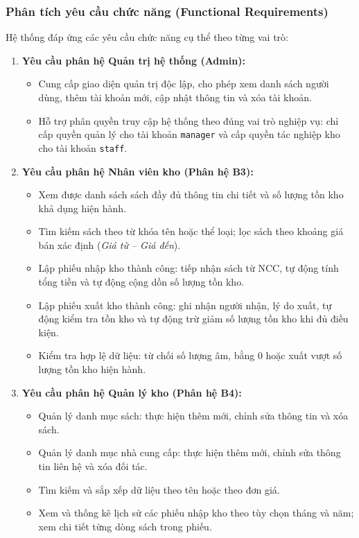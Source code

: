 \documentclass[12pt,a4paper]{article}
\begin{document}
\subsubsection{Phân tích yêu cầu chức năng (Functional Requirements)}
Hệ thống đáp ứng các yêu cầu chức năng cụ thể theo từng vai trò:
\begin{enumerate}
    \item \textbf{Yêu cầu phân hệ Quản trị hệ thống (Admin):}
    \begin{itemize}
        \item Cung cấp giao diện quản trị độc lập, cho phép xem danh sách người dùng, thêm tài khoản mới, cập nhật thông tin và xóa tài khoản.
        \item Hỗ trợ phân quyền truy cập hệ thống theo đúng vai trò nghiệp vụ: chỉ cấp quyền quản lý cho tài khoản \texttt{manager} và cấp quyền tác nghiệp kho cho tài khoản \texttt{staff}.
    \end{itemize}
    \item \textbf{Yêu cầu phân hệ Nhân viên kho (Phân hệ B3):}
    \begin{itemize}
        \item Xem được danh sách sách đầy đủ thông tin chi tiết và số lượng tồn kho khả dụng hiện hành.
        \item Tìm kiếm sách theo từ khóa tên hoặc thể loại; lọc sách theo khoảng giá bán xác định (\textit{Giá từ -- Giá đến}).
        \item Lập phiếu nhập kho thành công: tiếp nhận sách từ NCC, tự động tính tổng tiền và tự động cộng dồn số lượng tồn kho.
        \item Lập phiếu xuất kho thành công: ghi nhận người nhận, lý do xuất, tự động kiểm tra tồn kho và tự động trừ giảm số lượng tồn kho khi đủ điều kiện.
        \item Kiểm tra hợp lệ dữ liệu: từ chối số lượng âm, bằng 0 hoặc xuất vượt số lượng tồn kho hiện hành.
    \end{itemize}
    \item \textbf{Yêu cầu phân hệ Quản lý kho (Phân hệ B4):}
    \begin{itemize}
        \item Quản lý danh mục sách: thực hiện thêm mới, chỉnh sửa thông tin và xóa sách.
        \item Quản lý danh mục nhà cung cấp: thực hiện thêm mới, chỉnh sửa thông tin liên hệ và xóa đối tác.
        \item Tìm kiếm và sắp xếp dữ liệu theo tên hoặc theo đơn giá.
        \item Xem và thống kê lịch sử các phiếu nhập kho theo tùy chọn tháng và năm; xem chi tiết từng dòng sách trong phiếu.

\end{itemize}
\end{enumerate}
\end{document}
